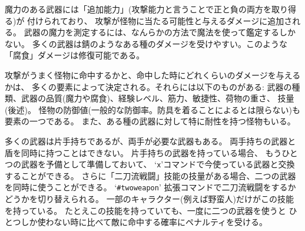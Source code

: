 魔力のある武器には「追加能力」(攻撃能力と言うことで正と負の両方を取り得る)が
付けられており、
攻撃が怪物に当たる可能性と与えるダメージに追加される。
武器の魔力を測定するには、なんらかの方法で魔法を使って鑑定するしかない。
多くの武器は錆のようなある種のダメージを受けやすい。このような
「腐食」ダメージは修復可能である。

攻撃がうまく怪物に命中するかと、命中した時にどれくらいのダメージを与えるかは、
多くの要素によって決定される。それらには以下のものがある:
武器の種類、武器の品質(魔力や腐食)、経験レベル、筋力、敏捷性、荷物の重さ、
技量(後述)。
怪物の防御値(一般的な防御率。防具を着ることによるとは限らない)も要素の一つである。
また、ある種の武器に対して特に耐性を持つ怪物もいる。

多くの武器は片手持ちであるが、両手が必要な武器もある。
両手持ちの武器と盾を同時に持つことはできない。
片手持ちの武器を持っている場合、
もうひとつの武器を予備として準備しておいて、
`{\tt x}'コマンドで今使っている武器と交換することができる。
さらに「二刀流戦闘」技能の技量がある場合、二つの武器を同時に使うことができる。
`{\tt \#twoweapon}' 拡張コマンドで二刀流戦闘をするかどうかを切り替えられる。
一部のキャラクター(例えば野蛮人)だけがこの技能を持っている。
たとえこの技能を持っていても、一度に二つの武器を使うと
ひとつしか使わない時に比べて敵に命中する確率にペナルティを受ける。

